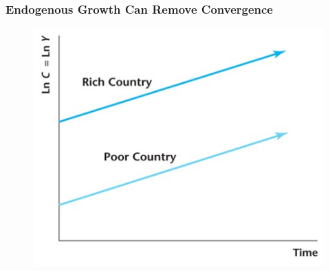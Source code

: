 \documentclass{beamer}
\begin{document}
\begin{frame}
\frametitle[alignment=center]{Endogenous Growth Can Remove Convergence}
\begin{figure}
\centering
\includegraphics[scale=0.5]{Figures/W_Fig_8pt8.png}
\end{figure}
\end{frame}
\end{document}
